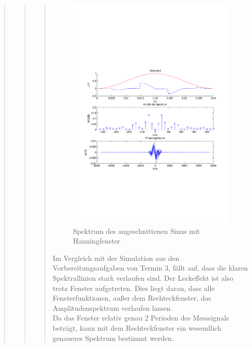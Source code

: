 \begin{quote}
\begin{quote}
\begin{quote}
\begin{figure}[H]
                \includegraphics[scale=0.7, trim = 1.5cm 7cm 1.5cm 8.5cm,
                clip]{./Bilder/Phasenanschnittsmessungmithanningfenster.pdf}
                    \caption{Spektrum des angeschnittenen Sinus mit Hanningfenster}
            \end{figure}
    
            Im Vergleich mit der Simulation aus den Vorbereitungsaufgaben von Termin 3, fällt auf, dass die klaren
            Spektrallinien stark verlaufen sind. Der Leckeffekt ist also trotz Fenster aufgetreten. Dies liegt daran,
            dass alle Fensterfunktionen, außer dem Rechteckfenster, das Amplitudenspektrum verlaufen lassen.\\
            Da das Fenster relativ genau 2 Perioden des Messsignals beträgt, kann mit dem Rechteckfenster ein wesendlich
            genaueres Spektrum bestimmt werden.\\
            

\end{quote}
\end{quote}
\end{quote}
